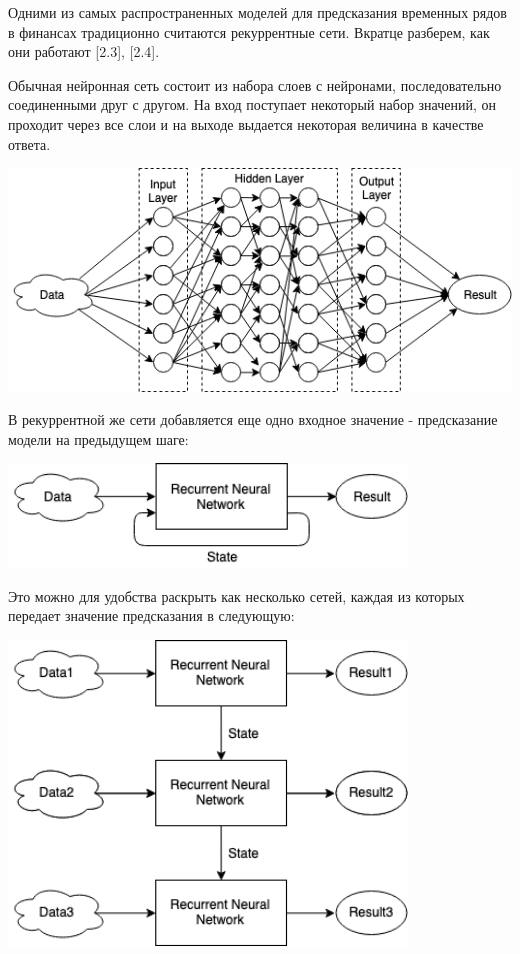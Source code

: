 Одними из самых распространенных моделей для предсказания временных рядов в финансах традиционно считаются рекуррентные сети. Вкратце разберем, как они работают [2.3], [2.4].

Обычная нейронная сеть состоит из набора слоев с нейронами, последовательно соединенными друг с другом. На вход поступает некоторый набор значений, он проходит через все слои и на выходе выдается некоторая величина в качестве ответа.


\begin{center}
    \includegraphics[width=450pt]{images/network_schema.png}
\end{center}

В рекуррентной же сети добавляется еще одно входное значение - предсказание модели на предыдущем шаге:

\begin{center}
    \includegraphics[width=300pt]{images/network_schema_2.png}
\end{center}
\newpage

Это можно для удобства раскрыть как несколько сетей, каждая из которых передает значение предсказания в следующую:

\begin{center}
    \includegraphics[width=300pt]{images/network_schema_3.png}
\end{center}

